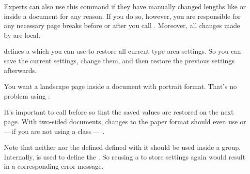 Experts can also use this command if they have manually changed lengths like
 or  inside a document for any reason. If
you do so, however, you are responsible for any necessary page breaks before
or after you call . Moreover, all changes made by
 are local.%
% 
\EndIndexGroup


\begin{Declaration}
\end{Declaration}
 defines a  which you can use to
restore all current type-area settings. So you can save the current settings,
change them, and then restore the previous settings afterwards.

\begin{Example}
  You want a landscape page inside a document with portrait format. That's
  no problem using :
  It's important to call 
  before  so that the saved values are restored on the
  next page. With two-sided documents, changes to the paper format should even
  use 
  or\,---\,if you are not using a \KOMAScript{}
  class\,---\,%
  .%
\end{Example}

Note that neither  nor the defined
 defined with it should be used inside a group.
Internally,
 is
used to define the . So reusing a
 to store settings again would result in a
corresponding error message.

